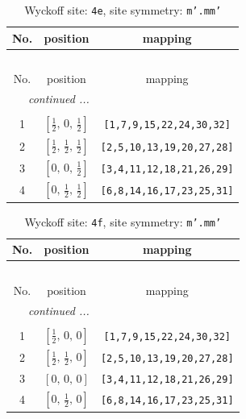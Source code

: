 \documentclass[fleqn,8pt]{jsarticle}
\begin{document}
\begin{longtable}{ccc}
\caption{Wyckoff site: {\tt 4e}, site symmetry: {\tt m'.mm'}}
 \\
 \hline \hline
No. & position & mapping \\ \hline \endfirsthead

\multicolumn{2}{l}{\tablename\ \thetable{}} \\
 \hline \hline
No. & position & mapping \\ \hline \endhead

 \hline \hline
\multicolumn{2}{r}{\footnotesize\it continued ...} \\ \endfoot

 \hline \hline
\multicolumn{2}{r}{} \\ \endlastfoot

1 & $\left[ \frac{1}{2},\, 0,\, \frac{1}{2} \right]$ & {\tt [1,7,9,15,22,24,30,32]} \\ \hline
2 & $\left[ \frac{1}{2},\, \frac{1}{2},\, \frac{1}{2} \right]$ & {\tt [2,5,10,13,19,20,27,28]} \\ \hline
3 & $\left[ 0,\, 0,\, \frac{1}{2} \right]$ & {\tt [3,4,11,12,18,21,26,29]} \\ \hline
4 & $\left[ 0,\, \frac{1}{2},\, \frac{1}{2} \right]$ & {\tt [6,8,14,16,17,23,25,31]} \\
\end{longtable}
\renewcommand{\arraystretch}{1.2}
\begin{longtable}{ccc}
\caption{Wyckoff site: {\tt 4f}, site symmetry: {\tt m'.mm'}}
 \\
 \hline \hline
No. & position & mapping \\ \hline \endfirsthead

\multicolumn{2}{l}{\tablename\ \thetable{}} \\
 \hline \hline
No. & position & mapping \\ \hline \endhead

 \hline \hline
\multicolumn{2}{r}{\footnotesize\it continued ...} \\ \endfoot

 \hline \hline
\multicolumn{2}{r}{} \\ \endlastfoot

1 & $\left[ \frac{1}{2},\, 0,\, 0 \right]$ & {\tt [1,7,9,15,22,24,30,32]} \\ \hline
2 & $\left[ \frac{1}{2},\, \frac{1}{2},\, 0 \right]$ & {\tt [2,5,10,13,19,20,27,28]} \\ \hline
3 & $\left[ 0,\, 0,\, 0 \right]$ & {\tt [3,4,11,12,18,21,26,29]} \\ \hline
4 & $\left[ 0,\, \frac{1}{2},\, 0 \right]$ & {\tt [6,8,14,16,17,23,25,31]} \\
\end{longtable}
\end{document}

